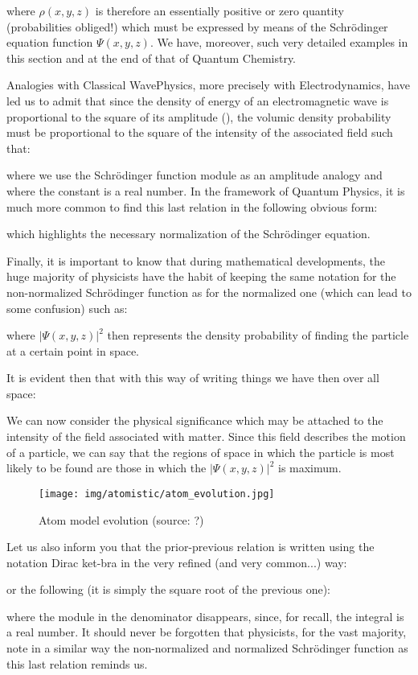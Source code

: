 	where $\rho(x,y,z)$ is therefore an essentially positive or zero quantity (probabilities obliged!) which must be expressed by means of the Schrödinger equation function $\Psi(x,y,z)$. We have, moreover, such very detailed examples in this section and at the end of that of Quantum Chemistry.
	
	Analogies with Classical WavePhysics, more precisely with Electrodynamics, have led us to admit that since the density of energy of an electromagnetic wave is proportional to the square of its amplitude (), the volumic density probability must be proportional to the square of the intensity of the associated field such that:
	
	where we use the Schrödinger function module as an amplitude analogy and where the constant is a real number. In the framework of Quantum Physics, it is much more common to find this last relation in the following obvious form:
	
	which highlights the necessary normalization of the Schrödinger equation.
	
	Finally, it is important to know that during mathematical developments, the huge majority of physicists have the habit of keeping the same notation for the non-normalized Schrödinger function as for the normalized one (which can lead to some confusion) such as:
	
	where $\lvert\Psi(x,y,z)\rvert^2$ then represents the density probability of finding the particle at a certain point in space.
	
	It is evident then that with this way of writing things we have then over all space:
	
	We can now consider the physical significance which may be attached to the intensity of the field associated with matter. Since this field describes the motion of a particle, we can say that the regions of space in which the particle is most likely to be found are those in which the $\lvert\Psi(x,y,z)\rvert^2$ is maximum.
	\begin{figure}[H]
		\centering
		\texttt{[image: img/atomistic/atom\_evolution.jpg]}
		\caption{Atom model evolution (source: ?)}
	\end{figure}
	Let us also inform you that the prior-previous relation is written using the notation Dirac ket-bra in the very refined (and very common...) way:
	
	or the following (it is simply the square root of the previous one):
	
	where the module in the denominator disappears, since, for recall, the integral is a real number. It should never be forgotten that physicists, for the vast majority, note in a similar way the non-normalized and normalized Schrödinger function as this last relation reminds us.
	
